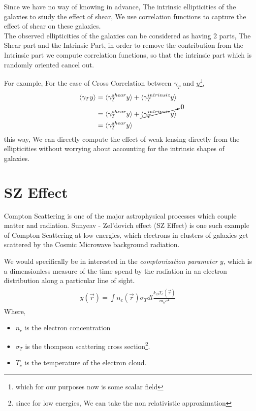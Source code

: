 Since we have no way of knowing in advance, The intrinsic ellipticities of the galaxies to study the effect of shear, We use correlation functions
to capture the effect of shear on these galaxies.\\
The observed ellipticities of the galaxies can be considered as having 2 parts, The Shear part and the Intrinsic Part, in order to remove the contribution from
the Intrinsic part we compute correlation functions, so that the intrinsic part which is randomly oriented cancel out.

For example, For the case of Cross Correlation between $\gamma_T$ and $y$\footnote{which for our purposes now is some scalar field}, 
\begin{align}
  \begin{split}
    \langle \gamma_T y \rangle &= \langle \gamma_T^{shear} y \rangle + \langle \gamma_T^{intrinsic} y \rangle \\
    &= \langle \gamma_T^{shear} y \rangle + \cancelto{0}{\langle \gamma_T^{intrinsic} y \rangle} \\
    &= \langle \gamma_T^{shear} y \rangle
  \end{split}
\end{align}
this way, We can directly compute the effect of weak lensing directly from the ellipticities without worrying about accounting
for the intrinsic shapes of galaxies.

\section{SZ Effect}
Compton Scattering is one of the major astrophysical processes which couple matter and radiation. Sunyeav - Zel'dovich effect (SZ Effect) is one
such example of Compton Scattering at low energies, which electrons in clusters of galaxies get scattered by the Cosmic Microwave background radiation.

We would specifically be in interested in the \emph{comptonization parameter} $y$, which is a dimensionless measure of the time spend by the radiation in an
electron distribution along a particular line of sight.
\begin{align}
  \begin{split}
    y(\vec{r}) = \int n_e(\vec{r}) \sigma_T dl \frac{k_B T_e(\vec{r})}{m_e c^2}
  \end{split}
\end{align}
Where,
\begin{itemize}
  \item $n_e$ is the electron concentration
  \item $\sigma_T$ is the thompson scattering cross section\footnote{since for low energies, We can take the non relativistic approximation}.
  \item $T_e$ is the temperature of the electron cloud.
\end{itemize}

